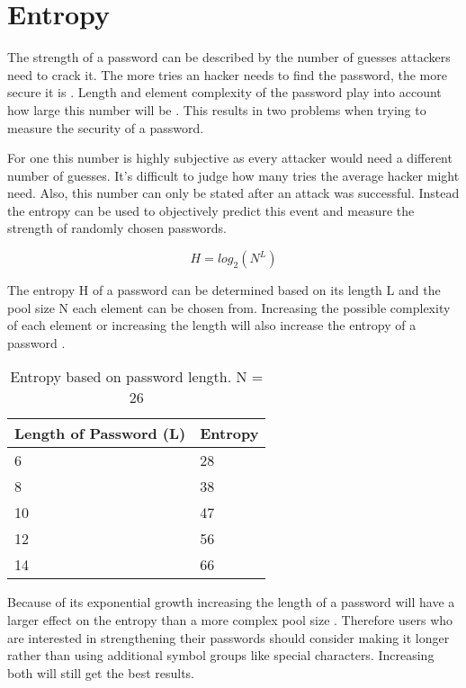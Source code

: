 \section{Entropy}

The strength of a password can be described by the number of guesses attackers need to crack it. The more tries an hacker needs to find the password, the more secure it is \cite{passwordquality}. Length and element complexity of the password play into account how large this number will be \cite{passwordstrength}. This results in two problems when trying to measure the security of a password.

For one this number is highly subjective as every attacker would need a different number of guesses. It's difficult to judge how many tries the average hacker might need. Also, this number can only be stated after an attack was successful. Instead the entropy can be used to objectively predict this event and measure the strength of randomly chosen passwords.

\begin{equation}
H = log_2(N^L)
\end{equation}

The entropy H of a password can be determined based on its length L and the pool size N each element can be chosen from. Increasing the possible complexity of each element or increasing the length will also increase the entropy of a password \cite{webernetz}.

\begin{table}[h!]
\centering
\begin{tabular}{l l}
    Length of Password (L)  & Entropy \\
    \hline
    6                       & 28 \\
    8                       & 38 \\
	10                      & 47 \\
    12                      & 56 \\
    14						& 66
\end{tabular}
\caption{Entropy based on password length. N = 26}
\end{table}

Because of its exponential growth increasing the length of a password will have a larger effect on the entropy than a more complex pool size \cite{webernetz}. Therefore users who are interested in strengthening their passwords should consider making it longer rather than using additional symbol groups like special characters. Increasing both will still get the best results.

